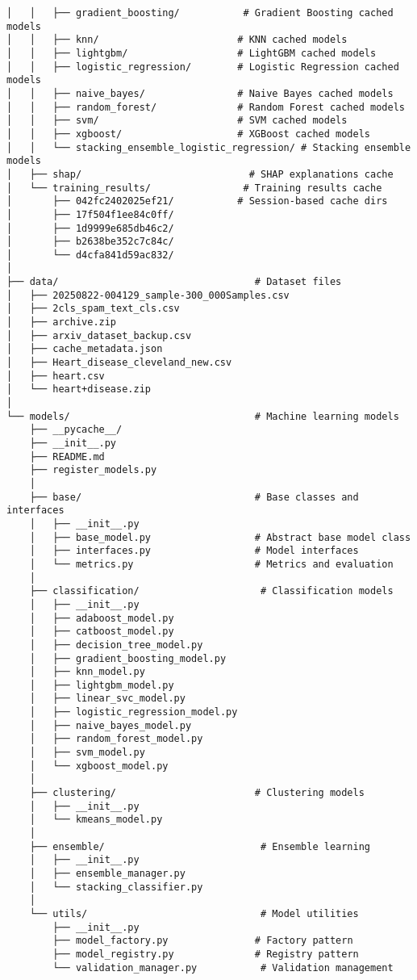 \begin{verbatim}
│   │   ├── gradient_boosting/           # Gradient Boosting cached models
│   │   ├── knn/                        # KNN cached models
│   │   ├── lightgbm/                   # LightGBM cached models
│   │   ├── logistic_regression/        # Logistic Regression cached models
│   │   ├── naive_bayes/                # Naive Bayes cached models
│   │   ├── random_forest/              # Random Forest cached models
│   │   ├── svm/                        # SVM cached models
│   │   ├── xgboost/                    # XGBoost cached models
│   │   └── stacking_ensemble_logistic_regression/ # Stacking ensemble models
│   ├── shap/                             # SHAP explanations cache
│   └── training_results/                # Training results cache
│       ├── 042fc2402025ef21/           # Session-based cache dirs
│       ├── 17f504f1ee84c0ff/
│       ├── 1d9999e685db46c2/
│       ├── b2638be352c7c84c/
│       └── d4cfa841d59ac832/
│
├── data/                                  # Dataset files
│   ├── 20250822-004129_sample-300_000Samples.csv
│   ├── 2cls_spam_text_cls.csv
│   ├── archive.zip
│   ├── arxiv_dataset_backup.csv
│   ├── cache_metadata.json
│   ├── Heart_disease_cleveland_new.csv
│   ├── heart.csv
│   └── heart+disease.zip
│
└── models/                                # Machine learning models
    ├── __pycache__/
    ├── __init__.py
    ├── README.md
    ├── register_models.py
    │
    ├── base/                              # Base classes and interfaces
    │   ├── __init__.py
    │   ├── base_model.py                  # Abstract base model class
    │   ├── interfaces.py                  # Model interfaces
    │   └── metrics.py                     # Metrics and evaluation
    │
    ├── classification/                     # Classification models
    │   ├── __init__.py
    │   ├── adaboost_model.py
    │   ├── catboost_model.py
    │   ├── decision_tree_model.py
    │   ├── gradient_boosting_model.py
    │   ├── knn_model.py
    │   ├── lightgbm_model.py
    │   ├── linear_svc_model.py
    │   ├── logistic_regression_model.py
    │   ├── naive_bayes_model.py
    │   ├── random_forest_model.py
    │   ├── svm_model.py
    │   └── xgboost_model.py
    │
    ├── clustering/                        # Clustering models
    │   ├── __init__.py
    │   └── kmeans_model.py
    │
    ├── ensemble/                           # Ensemble learning
    │   ├── __init__.py
    │   ├── ensemble_manager.py
    │   └── stacking_classifier.py
    │
    └── utils/                              # Model utilities
        ├── __init__.py
        ├── model_factory.py               # Factory pattern
        ├── model_registry.py              # Registry pattern
        └── validation_manager.py           # Validation management
\end{verbatim}


